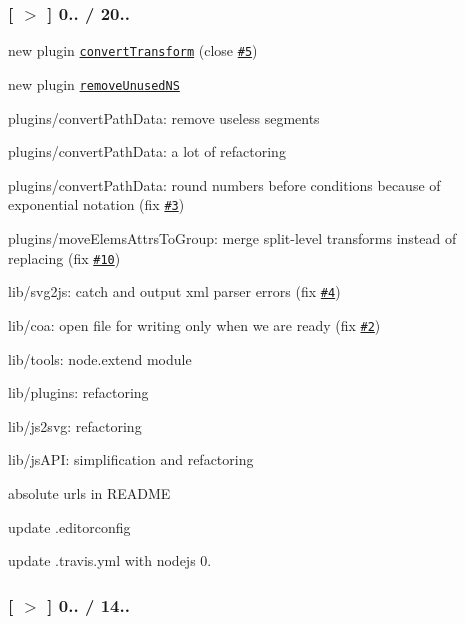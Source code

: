 \subsubsection*{\mbox{[} \href{https://github.com/svg/svgo/tree/v0.0.8}{\tt $>$} \mbox{]} 0.. / 20..}


\begin{DoxyItemize}
\item new plugin \href{plugins/convertTransform.js}{\tt convert\+Transform} (close \href{https://github.com/svg/svgo/issues/5}{\tt \#5})
\item new plugin \href{plugins/removeUnusedNS.js}{\tt remove\+Unused\+NS}
\item plugins/convert\+Path\+Data\+: remove useless segments
\item plugins/convert\+Path\+Data\+: a lot of refactoring
\item plugins/convert\+Path\+Data\+: round numbers before conditions because of exponential notation (fix \href{https://github.com/svg/svgo/issues/3}{\tt \#3})
\item plugins/move\+Elems\+Attrs\+To\+Group\+: merge split-\/level transforms instead of replacing (fix \href{https://github.com/svg/svgo/issues/10}{\tt \#10})
\item lib/svg2js\+: catch and output xml parser errors (fix \href{https://github.com/svg/svgo/issues/4}{\tt \#4})
\item lib/coa\+: open file for writing only when we are ready (fix \href{https://github.com/svg/svgo/issues/2}{\tt \#2})
\item lib/tools\+: node.\+extend module
\item lib/plugins\+: refactoring
\item lib/js2svg\+: refactoring
\item lib/js\+A\+PI\+: simplification and refactoring
\item absolute urls in R\+E\+A\+D\+ME
\item update .editorconfig
\item update .travis.\+yml with nodejs 0.
\end{DoxyItemize}

\subsubsection*{\mbox{[} \href{https://github.com/svg/svgo/tree/v0.0.7}{\tt $>$} \mbox{]} 0.. / 14..}


